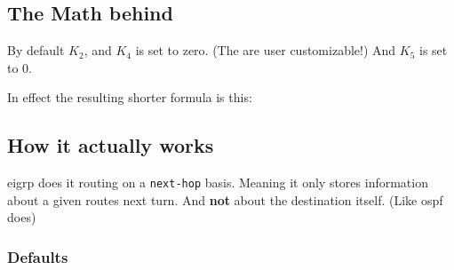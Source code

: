 \subsection[Math]{The Math behind}


By default $K_2$, and $K_4$ is set to zero. (The are user customizable!) And
$K_5$ is set to 0.

In effect the resulting shorter formula is this:


\subsection{How it actually works}

\gls{eigrp} does it routing on a \texttt{next-hop} basis. Meaning it only stores
information about a given routes next turn. And \textbf{not} about the
destination itself. (Like \gls{ospf} does)

\subsubsection{Defaults}

